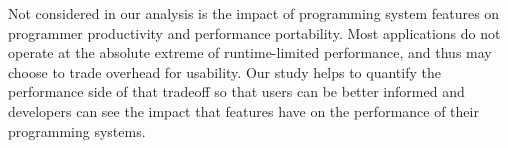 
Not considered in our analysis is the impact of programming system
features on programmer productivity and performance portability. Most
applications do not operate at the absolute extreme of runtime-limited
performance, and thus may choose to trade overhead for
usability. Our study helps to quantify the performance side of that
tradeoff so that users can be better informed and developers can see
the impact that features have on the performance of their programming
systems.
